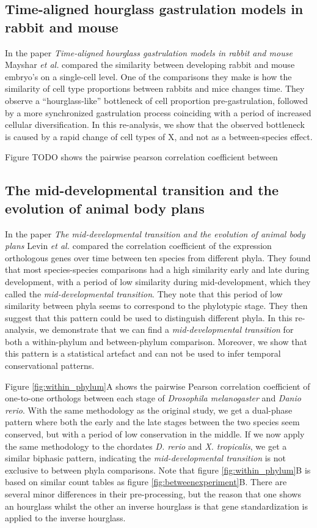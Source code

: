 \subsection{Time-aligned hourglass gastrulation models in rabbit and mouse} \label{subsection:mayshar}

In the paper \textit{Time-aligned hourglass gastrulation models in rabbit and mouse} Mayshar \textit{et al.} compared the similarity between developing rabbit and mouse embryo's on a single-cell level. One of the comparisons they make is how the similarity of cell type proportions between rabbits and mice changes time. They observe a ``hourglass-like'' bottleneck of cell proportion pre-gastrulation, followed by a more synchronized gastrulation process coinciding with a period of increased cellular diversification. In this re-analysis, we show that the observed bottleneck is caused by a rapid change of cell types of X, and not as a between-species effect.

Figure TODO shows the pairwise pearson correlation coefficient between 

\subsection{The mid-developmental transition and the evolution of animal body plans} \label{subsection:levin}

In the paper \textit{The mid-developmental transition and the evolution of animal body plans} Levin \textit{et al.} compared the correlation coefficient of the expression orthologous genes over time between ten species from different phyla. They found that most species-species comparisons had a high similarity early and late during development, with a period of low similarity during mid-development, which they called the \textit{mid-developmental transition}. They note that this period of low similarity between phyla seems to correspond to the phylotypic stage. They then suggest that this pattern could be used to distinguish different phyla. In this re-analysis, we demonstrate that we can find a \textit{mid-developmental transition} for both a within-phylum and between-phylum comparison. Moreover, we show that this pattern is a statistical artefact and can not be used to infer temporal conservational patterns.

Figure \ref{fig:within_phylum}A shows the pairwise Pearson correlation coefficient of one-to-one orthologs between each stage of \textit{Drosophila melanogaster} and \textit{Danio rerio}. With the same methodology as the original study, we get a dual-phase pattern where both the early and the late stages between the two species seem conserved, but with a period of low conservation in the middle. If we now apply the same methodology to the chordates \textit{D. rerio} and \textit{X. tropicalis}, we get a similar biphasic pattern, indicating the \textit{mid-developmental transition} is not exclusive to between phyla comparisons. Note that figure \ref{fig:within_phylum}B is based on similar count tables as figure \ref{fig:betweenexperiment}B. There are several minor differences in their pre-processing, but the reason that one shows an hourglass whilst the other an inverse hourglass is that gene standardization is applied to the inverse hourglass.


